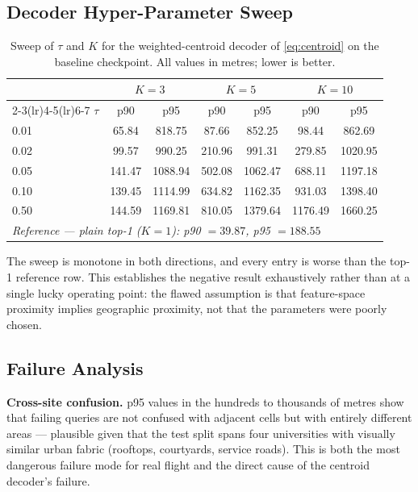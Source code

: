 \documentclass[journal]{IEEEtran}
\begin{document}
\subsection{Decoder Hyper-Parameter Sweep}

\begin{table}[!t]
\centering
\caption{Sweep of $\tau$ and $K$ for the weighted-centroid decoder of
\eqref{eq:centroid} on the baseline checkpoint. All values in metres; lower is better.}
\label{tab:ablation}
\begin{tabular}{lcccccc}
\toprule
& \multicolumn{2}{c}{$K=3$} & \multicolumn{2}{c}{$K=5$} & \multicolumn{2}{c}{$K=10$} \\
\cmidrule(lr){2-3}\cmidrule(lr){4-5}\cmidrule(lr){6-7}
$\tau$ & p90 & p95 & p90 & p95 & p90 & p95 \\
\midrule
0.01 & 65.84  & 818.75  & 87.66  & 852.25  & 98.44   & 862.69 \\
0.02 & 99.57  & 990.25  & 210.96 & 991.31  & 279.85  & 1020.95 \\
0.05 & 141.47 & 1088.94 & 502.08 & 1062.47 & 688.11  & 1197.18 \\
0.10 & 139.45 & 1114.99 & 634.82 & 1162.35 & 931.03  & 1398.40 \\
0.50 & 144.59 & 1169.81 & 810.05 & 1379.64 & 1176.49 & 1660.25 \\
\midrule
\multicolumn{7}{l}{\emph{Reference --- plain top-1 ($K=1$): p90 $=39.87$, p95 $=188.55$}}\\
\bottomrule
\end{tabular}
\end{table}

The sweep is monotone in both directions, and every entry is worse than the top-1
reference row. This establishes the negative result exhaustively rather than at a single
lucky operating point: the flawed assumption is that feature-space proximity implies
geographic proximity, not that the parameters were poorly chosen.

\subsection{Failure Analysis}
\textbf{Cross-site confusion.} p95 values in the hundreds to thousands of metres show that
failing queries are not confused with adjacent cells but with entirely different areas ---
plausible given that the test split spans four universities with visually similar urban
fabric (rooftops, courtyards, service roads). This is both the most dangerous failure mode
for real flight and the direct cause of the centroid decoder's failure.
\end{document}
